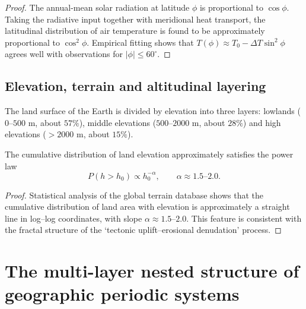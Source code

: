 \begin{proof}
The annual-mean solar radiation at latitude $\phi$ is proportional to $\cos\phi$. Taking the radiative input together with meridional heat transport, the latitudinal distribution of air temperature is found to be approximately proportional to $\cos^2\phi$. Empirical fitting shows that $T(\phi)\approx T_0-\Delta T\sin^2\phi$ agrees well with observations for $|\phi|\le 60^\circ$.
\end{proof}

\subsection{Elevation, terrain and altitudinal layering}

\begin{definition}\label{def:terrain_elevation}
The land surface of the Earth is divided by elevation into three layers: lowlands ($0$--$500$ m, about $57\%$), middle elevations ($500$--$2000$ m, about $28\%$) and high elevations ($>2000$ m, about $15\%$).
\end{definition}

\begin{proposition}\label{prop:hypsometric_curve}
The cumulative distribution of land elevation approximately satisfies the power law
\[
P(h>h_0)\propto h_0^{-\alpha},\qquad \alpha\approx 1.5\text{--}2.0.
\]
\end{proposition}

\begin{proof}
Statistical analysis of the global terrain database shows that the cumulative distribution of land area with elevation is approximately a straight line in log--log coordinates, with slope $\alpha\approx 1.5$--$2.0$. This feature is consistent with the fractal structure of the `tectonic uplift--erosional denudation' process.
\end{proof}

\section{The multi-layer nested structure of geographic periodic systems}
\label{sec:geo_nested}

